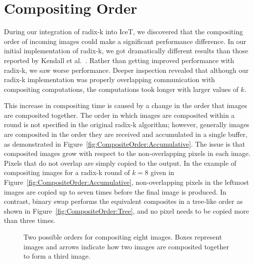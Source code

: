 \documentclass{sig-alternate}
\newcommand*{\scite}[1]{~\cite{#1}}
\newcommand{\etal}{et al.}
\begin{document}
\section{Compositing Order}
\label{sec:CompositingOrder}

During our integration of radix-k into IceT, we discovered that the
compositing order of incoming images could make a significant performance
difference.  In our initial implementation of radix-k, we got dramatically
different results than those reported by Kendall \etal\scite{Kendall2010}.
Rather than getting improved performance with radix-k, we saw worse
performance.  Deeper inspection revealed that although our radix-k
implementation was properly overlapping communication with compositing
computations, the computations took longer with larger values of $k$.

This increase in compositing time is caused by a change in the order that images
are composited together.  The order in which images are composited within a
round is not specified in the original radix-k algorithm; however,
generally images are composited in the order they are received and
accumulated in a single buffer, as demonstrated in
Figure~\ref{fig:CompositeOrder:Accumulative}.  The issue is that composited
images grow with respect to the non-overlapping pixels in each image.
Pixels that do not overlap are simply copied to the output.  In the example
of compositing images for a radix-k round of $k=8$ given in
Figure~\ref{fig:CompositeOrder:Accumulative}, non-overlapping pixels in the
leftmost images are copied up to seven times before the final image is
produced.  In contrast, binary swap performs the equivalent composites in a
tree-like order as shown in Figure~\ref{fig:CompositeOrder:Tree}, and no
pixel needs to be copied more than three times.

\begin{figure}[htbp]
  \centering
  \quad
  \caption{Two possible orders for compositing eight images.  Boxes
    represent images and arrows indicate how two images are composited
    together to form a third image.}
  \label{fig:CompositeOrder}
\end{figure}
\end{document}
